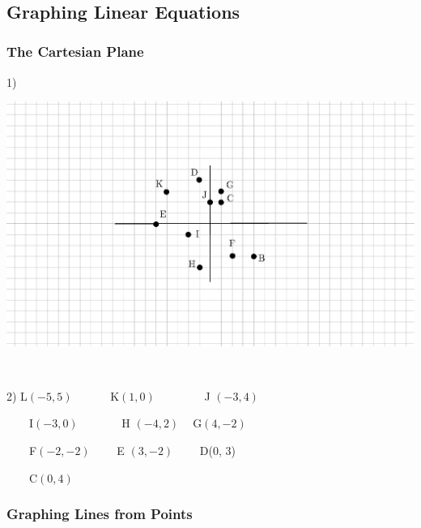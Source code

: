 \vspace{3in}
~

\pagebreak

\subsection{Graphing Linear Equations}\par


\subsubsection{The Cartesian Plane}\par

{}
1)
\begin{multicols}{2}
  \includegraphics[scale=1,bb = 115 65 310 190, clip=true]{II_1_3bp-1.eps}
\end{multicols}

\

{}

2) L$(- 5, 5)$ \ \ \ \ \ \ K$(1, 0)$ \ \ \ \ \ \ \ \ J $(- 3, 4)$

\ \ \ \ I$(- 3, 0)$ \ \ \ \ \ \ \ H $(- 4, 2) \ \ \ \ $ G$(4, -2)$

\ \ \ \ F$(- 2, - 2)$ \ \ \ \ E $(3, - 2)$ \ \ \ \ D(0, 3)

\ \ \ \ C$(0, 4)$

\subsubsection{Graphing Lines from Points}\par

{}

